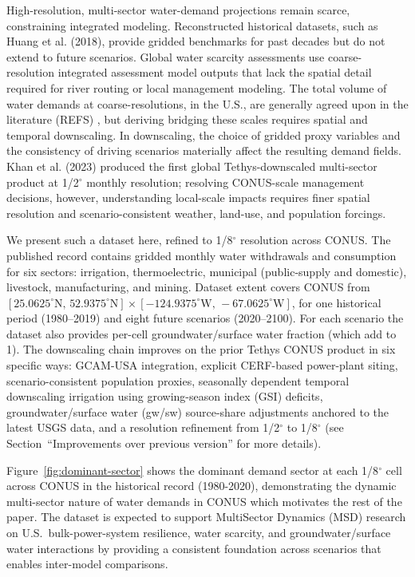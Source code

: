 \documentclass[fleqn,10pt]{wlscirep}
\begin{document}
High-resolution, multi-sector water-demand projections remain scarce, constraining integrated modeling. Reconstructed historical datasets, such as Huang et al. (2018)\cite{Huang2018}, provide gridded benchmarks for past decades but do not extend to future scenarios. Global water scarcity assessments use coarse-resolution integrated assessment model outputs that lack the spatial detail required for river routing or local management modeling\cite{Wada_2017, van_Vliet_2021}. The total volume of water demands at coarse-resolutions, in the U.S., are generally agreed upon in the literature (REFS) \cite{Zhao_gcamusa_water, naseri2025united, Stets2025USGS}, but deriving bridging these scales requires spatial and temporal downscaling\cite{hess-17-4555-2013, van_Vliet_2021, Jones_2024}. In downscaling, the choice of gridded proxy variables and the consistency of driving scenarios materially affect the resulting demand fields. Khan et al. (2023)\cite{Khan2023} produced the first global Tethys-downscaled multi-sector product at 1/2$^{\circ}$ monthly resolution; resolving CONUS-scale management decisions, however, understanding local-scale impacts requires finer spatial resolution and scenario-consistent weather, land-use, and population forcings.

We present such a dataset here, refined to 1/8$^{\circ}$ resolution across CONUS. The published record contains gridded monthly water withdrawals and consumption for six sectors: irrigation, thermoelectric, municipal (public-supply and domestic), livestock, manufacturing, and mining. Dataset extent covers CONUS from $[25.0625^{\circ}\text{N},\,52.9375^{\circ}\text{N}] \times [-124.9375^{\circ}\text{W},\,-67.0625^{\circ}\text{W}]$, for one historical period (1980--2019) and eight future scenarios (2020--2100). For each scenario the dataset also provides per-cell groundwater/surface water fraction (which add to 1). The downscaling chain improves on the prior Tethys CONUS product in six specific ways: GCAM-USA integration, explicit CERF-based\cite{Vernon2021} power-plant siting, scenario-consistent population proxies, seasonally dependent temporal downscaling irrigation using growing-season index (GSI) deficits, groundwater/surface water (gw/sw) source-share adjustments anchored to the latest USGS data, and a resolution refinement from 1/2$^{\circ}$ to 1/8$^{\circ}$ (see Section~``Improvements over previous version'' for more details). 

Figure~\ref{fig:dominant-sector} shows the dominant demand sector at each 1/8$^{\circ}$ cell across CONUS in the historical record (1980-2020), demonstrating the dynamic multi-sector nature of water demands in CONUS which motivates the rest of the paper. The dataset is expected to support MultiSector Dynamics (MSD) research on U.S.\ bulk-power-system resilience, water scarcity, and groundwater/surface water interactions by providing a consistent foundation across scenarios that enables inter-model comparisons. 
\end{document}
